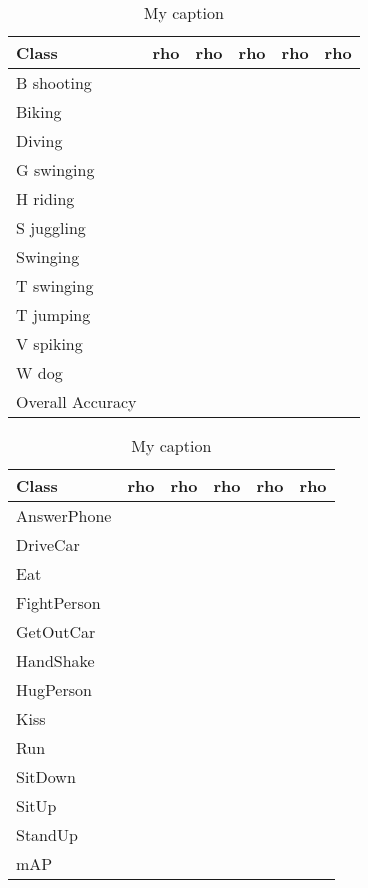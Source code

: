 \begin{table}[]
\centering
\caption{My caption}
\label{my-label}
\begin{tabular}{|l||l|l|l|l|l|}
\hline
Class            & rho & rho & rho & rho & rho \\ \hline  \hline
B shooting       &     &     &     &     &     \\ \hline
Biking           &     &     &     &     &     \\ \hline
Diving           &     &     &     &     &     \\ \hline
G swinging       &     &     &     &     &     \\ \hline
H riding         &     &     &     &     &     \\ \hline
S juggling       &     &     &     &     &     \\ \hline
Swinging         &     &     &     &     &     \\ \hline
T swinging       &     &     &     &     &     \\ \hline
T jumping        &     &     &     &     &     \\ \hline
V spiking        &     &     &     &     &     \\ \hline
W dog            &     &     &     &     &     \\ \hline \hline
Overall Accuracy &     &     &     &     &     \\ \hline
\end{tabular}
\end{table}

\begin{table}[]
\centering
\caption{My caption}
\label{my-label}
\begin{tabular}{|l|l|l|l|l|l|}
\hline
Class            & rho & rho & rho & rho & rho \\ \hline
AnswerPhone       &     &     &     &     &     \\ \hline
DriveCar           &     &     &     &     &     \\ \hline
Eat           &     &     &     &     &     \\ \hline
FightPerson         &     &     &     &     &     \\ \hline
GetOutCar       &     &     &     &     &     \\ \hline
HandShake        &     &     &     &     &     \\ \hline
HugPerson       &     &     &     &     &     \\ \hline
Kiss        &     &     &     &     &     \\ \hline
Run        &     &     &     &     &     \\ \hline
SitDown           &     &     &     &     &     \\ \hline
SitUp           &     &     &     &     &     \\ \hline
StandUp           &     &     &     &     &     \\ \hline
mAP          &     &     &     &     &     \\ \hline
\end{tabular}
\end{table}

